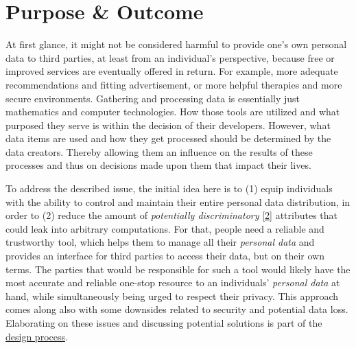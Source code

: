 \documentclass[12pt,english,a4paper,titlepage,cleardoublepage=empty,dottedtoc]{report}
\begin{document}
\section{Purpose \& Outcome}\label{purpose-outcome}

At first glance, it might not be considered harmful to provide one's own
personal data to third parties, at least from an individual's
perspective, because free or improved services are eventually offered in
return. For example, more adequate recommendations and fitting
advertisement, or more helpful therapies and more secure environments.
Gathering and processing data is essentially just mathematics and
computer technologies. How those tools are utilized and what purposed
they serve is within the decision of their developers. However, what
data items are used and how they get processed should be determined by
the data creators. Thereby allowing them an influence on the results of
these processes and thus on decisions made upon them that impact their
lives.

To address the described issue, the initial idea here is to (1) equip
individuals with the ability to control and maintain their entire
personal data distribution, in order to (2) reduce the amount of
\emph{potentially discriminatory}
{[}\protect\hyperlink{ref-paper_2008_discrimination-aware-data-mining}{2}{]}
attributes that could leak into arbitrary computations. For that, people
need a reliable and trustworthy tool, which helps them to manage all
their \emph{personal data} and provides an interface for third parties
to access their data, but on their own terms. The parties that would be
responsible for such a tool would likely have the most accurate and
reliable one-stop resource to an individuals' \emph{personal data} at
hand, while simultaneously being urged to respect their privacy. This
approach comes along also with some downsides related to security and
potential data loss. Elaborating on these issues and discussing
potential solutions is part of the
\protect\hyperlink{design-discussion}{design process}.
\end{document}
